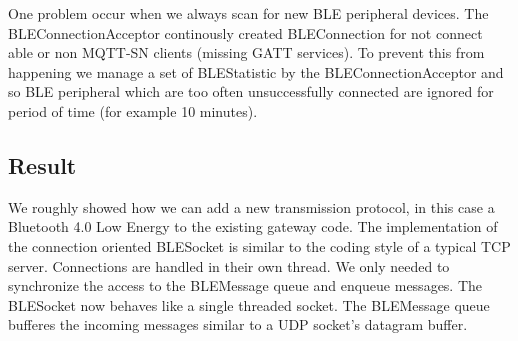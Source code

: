 One problem occur when we always scan for new BLE peripheral devices.
The BLEConnectionAcceptor continously created BLEConnection for not connect able or non MQTT-SN clients (missing GATT services).
To prevent this from happening we manage a set of BLEStatistic by the BLEConnectionAcceptor and so BLE peripheral which are too often unsuccessfully connected are ignored for period of time (for example 10 minutes).
\subsection{Result}
We roughly showed how we can add a new transmission protocol, in this case a Bluetooth 4.0 Low Energy to the existing gateway code.
The implementation of the connection oriented BLESocket is similar to the coding style of a typical TCP server.
Connections are handled in their own thread.
We only needed to synchronize the access to the BLEMessage queue and enqueue messages.
The BLESocket now behaves like a single threaded socket.
The BLEMessage queue bufferes the incoming messages similar to a UDP socket's datagram buffer.